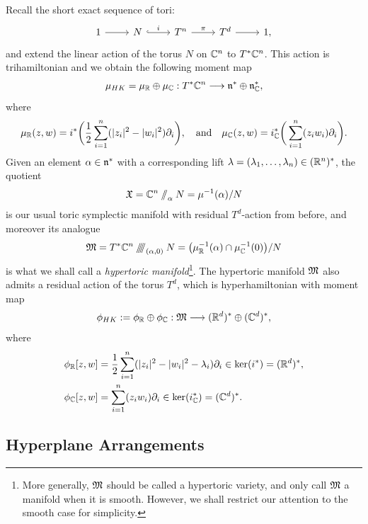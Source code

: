 Recall the short exact sequence of tori:
\[
\begin{tikzcd}
1 \arrow[r] & N \arrow[r, hook, "i"] & T^{n} \arrow[r, "\pi"] &
T^{d} \arrow[r] & 1,
\end{tikzcd}
\]
and extend the linear action of the torus $N$ on $\mathbb{C}^{n}$ to $T^{\ast}\mathbb{C}^{n}$. This action is trihamiltonian and we obtain the following \HK moment map
$$
	\mu_{HK} = \mu_{\mathbb{R}} \oplus \mu_{\mathbb{C}} :T^{\ast}\mathbb{C}^{n} \longrightarrow \mathfrak{n}^{\ast} \oplus \mathfrak{n}_{\mathbb{C}}^{\ast},
$$
where
$$
	\mu_{\mathbb{R}}(z,w) = i^{\ast}\bigg( \frac{1}{2}\sum_{i=1}^{n}( |z_{i}|^{2} - |w_{i}|^{2})\partial_{i} \bigg),\quad \text{and}\quad \mu_{\mathbb{C}}(z,w) = i_{\mathbb{C}}^{\ast}\bigg( \sum_{i=1}^{n}(z_{i}w_{i}) \partial_{i} \bigg).
$$
Given an element $\alpha \in \mathfrak{n}^{\ast}$ with a corresponding lift $\lambda = (\lambda_{1},\ldots, \lambda_{n}) \in (\mathbb{R}^{n})^{\ast}$, the \K quotient
$$
	\mathfrak{X} = \mathbb{C}^{n}\mathbin{/\mkern-6mu/}_{\alpha}N = \mu^{-1}(\alpha)/N
$$
is our usual toric symplectic manifold with residual $T^{d}$-action from before, and moreover its \HK analogue
$$
	\mathfrak{M} = T^{\ast}\mathbb{C}^{n} \mathbin{/\mkern-6mu/\mkern-6mu/\mkern-6mu/}_{(\alpha,0)} N = \big( \mu_{\mathbb{R}}^{-1}(\alpha) \cap \mu_{\mathbb{C}}^{-1}(0)\big)/N
$$
is what we shall call a \emph{hypertoric manifold}\footnote{More generally, $\mathfrak{M}$ should be called a hypertoric variety, and only call $\mathfrak{M}$ a manifold when it is smooth. However, we shall restrict our attention to the smooth case for simplicity.}. The hypertoric manifold $\mathfrak{M}$ also admits a residual action of the torus $T^{d}$, which is hyperhamiltonian with \HK moment map
$$
	\phi_{HK} := \phi_{\mathbb{R}} \oplus \phi_{\mathbb{C}}: \mathfrak{M} \longrightarrow (\mathbb{R}^{d})^{\ast} \oplus (\mathbb{C}^{d})^{\ast},
$$
where
\begin{equation*}
	\begin{split}
		\phi_{\mathbb{R}}[z,w] &= \frac{1}{2}\sum_{i=1}^{n}(|z_{i}|^{2} - |w_{i}|^{2} - \lambda_{i})\partial_{i} \in \ker(i^{\ast}) = (\mathbb{R}^{d})^{\ast},\\
		\phi_{\mathbb{C}}[z,w] &= \sum_{i=1}^{n}(z_{i}w_{i}) \partial_{i} \in \ker(i_{\mathbb{C}}^{\ast}) = (\mathbb{C}^{d})^{\ast}.
	\end{split}
\end{equation*}

\subsection{Hyperplane Arrangements}

